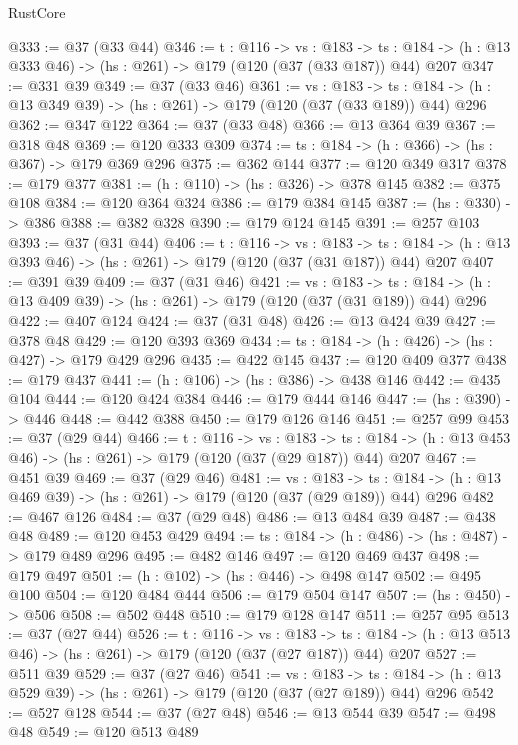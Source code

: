 \begin{lexlean}{RustCore}
\begin{coremodule}
@333 := @37 (@33 @44)
@346 := {t : @116} ->
  {vs : @183} ->
  {ts : @184} -> (h : @13 @333 @46) -> (hs : @261) -> @179 (@120 (@37 (@33 @187)) @44) @207
@347 := @331 @39
@349 := @37 (@33 @46)
@361 := {vs : @183} ->
  {ts : @184} -> (h : @13 @349 @39) -> (hs : @261) -> @179 (@120 (@37 (@33 @189)) @44) @296
@362 := @347 @122
@364 := @37 (@33 @48)
@366 := @13 @364 @39
@367 := @318 @48
@369 := @120 @333 @309
@374 := {ts : @184} -> (h : @366) -> (hs : @367) -> @179 @369 @296
@375 := @362 @144
@377 := @120 @349 @317
@378 := @179 @377
@381 := (h : @110) -> (hs : @326) -> @378 @145
@382 := @375 @108
@384 := @120 @364 @324
@386 := @179 @384 @145
@387 := (hs : @330) -> @386
@388 := @382 @328
@390 := @179 @124 @145
@391 := @257 @103
@393 := @37 (@31 @44)
@406 := {t : @116} ->
  {vs : @183} ->
  {ts : @184} -> (h : @13 @393 @46) -> (hs : @261) -> @179 (@120 (@37 (@31 @187)) @44) @207
@407 := @391 @39
@409 := @37 (@31 @46)
@421 := {vs : @183} ->
  {ts : @184} -> (h : @13 @409 @39) -> (hs : @261) -> @179 (@120 (@37 (@31 @189)) @44) @296
@422 := @407 @124
@424 := @37 (@31 @48)
@426 := @13 @424 @39
@427 := @378 @48
@429 := @120 @393 @369
@434 := {ts : @184} -> (h : @426) -> (hs : @427) -> @179 @429 @296
@435 := @422 @145
@437 := @120 @409 @377
@438 := @179 @437
@441 := (h : @106) -> (hs : @386) -> @438 @146
@442 := @435 @104
@444 := @120 @424 @384
@446 := @179 @444 @146
@447 := (hs : @390) -> @446
@448 := @442 @388
@450 := @179 @126 @146
@451 := @257 @99
@453 := @37 (@29 @44)
@466 := {t : @116} ->
  {vs : @183} ->
  {ts : @184} -> (h : @13 @453 @46) -> (hs : @261) -> @179 (@120 (@37 (@29 @187)) @44) @207
@467 := @451 @39
@469 := @37 (@29 @46)
@481 := {vs : @183} ->
  {ts : @184} -> (h : @13 @469 @39) -> (hs : @261) -> @179 (@120 (@37 (@29 @189)) @44) @296
@482 := @467 @126
@484 := @37 (@29 @48)
@486 := @13 @484 @39
@487 := @438 @48
@489 := @120 @453 @429
@494 := {ts : @184} -> (h : @486) -> (hs : @487) -> @179 @489 @296
@495 := @482 @146
@497 := @120 @469 @437
@498 := @179 @497
@501 := (h : @102) -> (hs : @446) -> @498 @147
@502 := @495 @100
@504 := @120 @484 @444
@506 := @179 @504 @147
@507 := (hs : @450) -> @506
@508 := @502 @448
@510 := @179 @128 @147
@511 := @257 @95
@513 := @37 (@27 @44)
@526 := {t : @116} ->
  {vs : @183} ->
  {ts : @184} -> (h : @13 @513 @46) -> (hs : @261) -> @179 (@120 (@37 (@27 @187)) @44) @207
@527 := @511 @39
@529 := @37 (@27 @46)
@541 := {vs : @183} ->
  {ts : @184} -> (h : @13 @529 @39) -> (hs : @261) -> @179 (@120 (@37 (@27 @189)) @44) @296
@542 := @527 @128
@544 := @37 (@27 @48)
@546 := @13 @544 @39
@547 := @498 @48
@549 := @120 @513 @489

\end{coremodule}
\end{lexlean}
